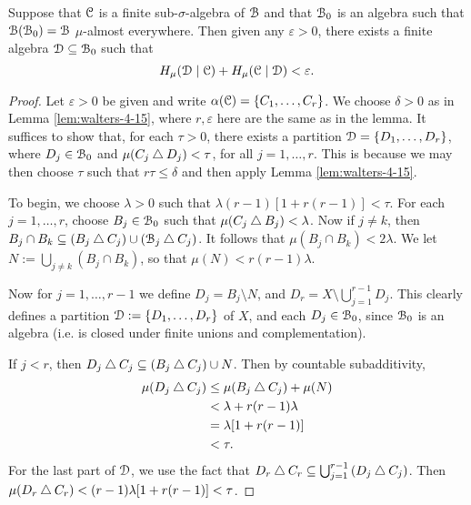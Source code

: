 \begin{theorem} \label{thm:walters-4-16}
	Suppose that $\mathcal{C}$ is a finite sub-$\sigma$-algebra of $\mathcal{B}$ and that $\mathcal{B}_0$ is an algebra such that $\mathcal{B}(\mathcal{B}_0) = \mathcal{B}$ $\mu$-almost everywhere. Then given any $\varepsilon > 0$, there exists a finite algebra $\mathcal{D} \subseteq \mathcal{B}_0$ such that
	\[
		H_\mu(\mathcal{D} \mid \mathcal{C}) + H_\mu(\mathcal{C} \mid \mathcal{D}) < \varepsilon.
	\]
	
	\begin{proof}
		Let $\varepsilon > 0$ be given and write $\alpha(\mathcal{C}) = \{C_1, \dots, C_r\}$. We choose $\delta > 0$ as in Lemma \ref{lem:walters-4-15}, where $r, \varepsilon$ here are the same as in the lemma. It suffices to show that, for each $\tau > 0$, there exists a partition $\mathcal{D} = \{D_1, \dots, D_r\}$, where $D_j \in \mathcal{B}_0$ and $\mu(C_j \bigtriangleup D_j) < \tau$, for all $j = 1, \dots, r$. This is because we may then choose $\tau$ such that $r\tau \leq \delta$ and then apply Lemma \ref{lem:walters-4-15}.
		
		To begin, we choose $\lambda > 0$ such that $\lambda(r - 1)[1 + r(r - 1)] < \tau$. For each $j = 1, \dots, r$, choose $B_j \in \mathcal{B}_0$ such that $\mu(C_j \bigtriangleup B_j) < \lambda$. Now if $j \neq k$, then $B_j \cap B_k \subseteq (B_j \bigtriangleup C_j) \cup (\mathcal{B}_j \bigtriangleup C_j)$. It follows that $\mu(B_j \cap B_k) < 2\lambda$. We let $N := \bigcup_{j \neq k}{(B_j \cap B_k)}$, so that $\mu(N) < r(r - 1)\lambda$.
		
		Now for $j = 1, \dots, r - 1$ we define $D_j = B_j \setminus N$, and $D_r = X \setminus \bigcup_{j = 1}^{r - 1}{D_j}$. This clearly defines a partition $\mathcal{D} := \{D_1, \dots, D_r\}$ of $X$, and each $D_j \in \mathcal{B}_0$, since $\mathcal{B}_0$ is an algebra (i.e. is closed under finite unions and complementation).
		
		If $j < r$, then $D_j \bigtriangleup C_j \subseteq (B_j \bigtriangleup C_j) \cup N$. Then by countable subadditivity,
		\begin{align*}
			\mu(D_j \bigtriangleup C_j) &\leq \mu(B_j \bigtriangleup C_j) + \mu(N) \\
				&< \lambda + r(r - 1)\lambda \\
				&= \lambda[1 + r(r - 1)] \\
				&< \tau.
		\end{align*}
		For the last part of $\mathcal{D}$, we use the fact that $D_r \bigtriangleup C_r \subseteq \bigcup_{j = 1}^{r - 1}{(D_j \bigtriangleup C_j)}$. Then $\mu(D_r \bigtriangleup C_r) < (r - 1)\lambda[1 + r(r - 1)] < \tau$.
	\end{proof}
\end{theorem}

